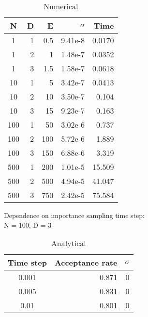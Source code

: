 \documentclass[english, a4paper]{article}
\begin{document}
\begin{table}[H]
  \centering
  \begin{tabular}{ | c | r | r | r | r |}
    \hline
    N& D& E& $\sigma$& Time \\*
    \hline
    1& 1& 0.5& 9.41e-8& 0.0170 \\*
    \hline
    1& 2& 1& 1.48e-7&  0.0352\\*
    \hline
    1& 3& 1.5& 1.58e-7&  0.0618\\*
    \hline
    10& 1& 5& 3.42e-7&  0.0413\\*
    \hline
    10& 2& 10& 3.50e-7&  0.104\\*
    \hline
    10& 3& 15& 9.23e-7&  0.163\\*
    \hline
    100& 1& 50& 3.02e-6&  0.737\\*
    \hline
    100& 2& 100& 5.72e-6&  1.889\\*
    \hline
    100& 3& 150& 6.88e-6&  3.319\\*
    \hline
    500& 1& 200& 1.01e-5&  15.509\\*
    \hline
    500& 2& 500& 4.94e-5&  41.047\\*
    \hline
    500& 3& 750& 2.42e-5&  75.584\\*
    \hline
  \end{tabular}
  \caption{Numerical}
  \label{tab:Tabell1}
\end{table}


Dependence on importance sampling time step:\\
N = 100, D = 3


\begin{table}[H]
  \centering
  \begin{tabular}{ | c | r | r |}
    \hline
    Time step& Acceptance rate& $\sigma$ \\*
    \hline
    0.001& 0.871& 0 \\*
    \hline
    0.005& 0.831& 0 \\*
    \hline
    0.01&  0.801& 0 \\*
    \hline
  \end{tabular}
  \caption{Analytical}
  \label{tab:Tabell1}
\end{table}
\end{document}
